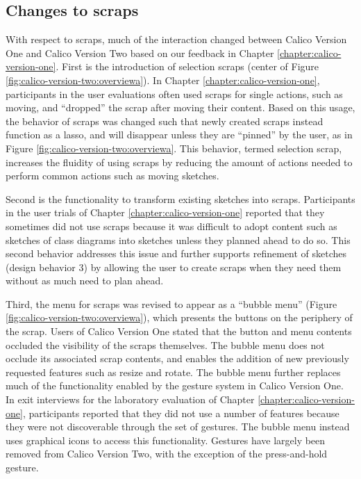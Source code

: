 \subsection{Changes to scraps}

With respect to scraps, much of the interaction changed between Calico Version One and Calico Version Two based on our feedback in Chapter \ref{chapter:calico-version-one}. First is the introduction of selection scraps (center of Figure \ref{fig:calico-version-two:overviewa}). In Chapter \ref{chapter:calico-version-one}, participants in the user evaluations often used scraps for single actions, such as moving, and ``dropped'' the scrap after moving their content. Based on this usage, the behavior of scraps was changed such that newly created scraps instead function as a lasso, and will disappear unless they are ``pinned'' by the user, as in Figure \ref{fig:calico-version-two:overviewa}. This behavior, termed selection scrap, increases the fluidity of using scraps by reducing the amount of actions needed to perform common actions such as moving sketches. 

Second is the functionality to transform existing sketches into scraps. Participants in the user trials of Chapter \ref{chapter:calico-version-one} reported that they sometimes did not use scraps because it was difficult to adopt content such as sketches of class diagrams into sketches unless they planned ahead to do so. This second behavior addresses this issue and further supports refinement of sketches (design behavior 3) by allowing the user to create scraps when they need them without as much need to plan ahead. 

Third, the menu for scraps was revised to appear as a ``bubble menu'' (Figure \ref{fig:calico-version-two:overviewa}), which presents the buttons on the periphery of the scrap. Users of Calico Version One stated that the button and menu contents occluded the visibility of the scraps themselves. The bubble menu does not occlude its associated scrap contents, and enables the addition of new previously requested features such as resize and rotate. The bubble menu further replaces much of the functionality enabled by the gesture system in Calico Version One. In exit interviews for the laboratory evaluation of Chapter \ref{chapter:calico-version-one}, participants reported that they did not use a number of features because they were not discoverable through the set of gestures. The bubble menu instead uses graphical icons to access this functionality. Gestures have largely been removed from Calico Version Two, with the exception of the press-and-hold gesture.

